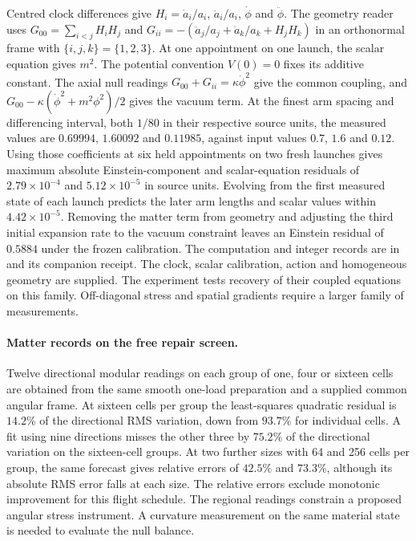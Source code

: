\documentclass[11pt]{article}
\begin{document}
Centred clock differences give $H_i=\dot a_i/a_i$, $\ddot a_i/a_i$,
$\dot\phi$ and $\ddot\phi$. The geometry reader uses
$G_{00}=\sum_{i<j}H_iH_j$ and
$G_{ii}=-(\ddot a_j/a_j+\ddot a_k/a_k+H_jH_k)$ in an orthonormal
frame with $\{i,j,k\}=\{1,2,3\}$. At one appointment on one launch,
the scalar equation gives $m^2$. The potential convention $V(0)=0$
fixes its additive constant. The axial null readings
$G_{00}+G_{ii}=\kappa\dot\phi^2$ give the common coupling, and
$G_{00}-\kappa(\dot\phi^2+m^2\phi^2)/2$ gives the vacuum term.
At the finest arm spacing and differencing interval, both $1/80$ in
their respective source units, the measured values are $0.69994$,
$1.60092$ and $0.11985$, against input values $0.7$, $1.6$ and $0.12$.
Using those coefficients at six held appointments on two fresh launches
gives maximum absolute Einstein-component and scalar-equation residuals
of $2.79\times10^{-4}$ and $5.12\times10^{-5}$ in source units.
Evolving from the first measured state of each launch predicts the
later arm lengths and scalar values within $4.42\times10^{-5}$.
Removing the matter term from geometry and adjusting the third initial
expansion rate to the vacuum constraint leaves an Einstein residual of
$0.5884$ under the frozen calibration. The computation and integer records
are in  and its
companion receipt. The clock, scalar calibration, action and homogeneous
geometry are supplied. The experiment tests recovery of their coupled
equations on this family. Off-diagonal stress and spatial gradients
require a larger family of measurements.

\paragraph{Matter records on the free repair screen.}
Twelve directional modular readings on each group of one, four or sixteen
cells are obtained from the same smooth one-load preparation and a
supplied common angular frame. At sixteen cells per group the
least-squares quadratic residual is $14.2\%$ of the directional RMS
variation, down from $93.7\%$ for individual cells. A fit using nine
directions misses the other three by $75.2\%$ of the directional
variation on the sixteen-cell groups. At two further sizes with 64 and
256 cells per group, the same forecast gives relative errors of $42.5\%$
and $73.3\%$, although its absolute RMS error falls at each size. The
relative errors exclude monotonic improvement for this flight schedule.
The regional readings constrain
a proposed angular stress instrument. A curvature measurement on the
same material state is needed to evaluate the null balance.
\end{document}
